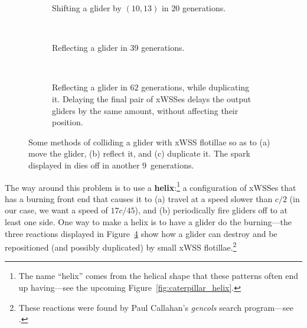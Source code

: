 \begin{figure}[!htb]
	\centering
	\begin{subfigure}[b]{0.475\textwidth}
		\centering
		\caption{Shifting a glider by $(10,13)$ in $20$ generations.}\label{fig:helix_shift}
	\end{subfigure} \quad \ \ \ \begin{subfigure}[b]{0.475\textwidth}
		\centering
		\caption{Reflecting a glider in $39$ generations.}\label{fig:helix_reflect}
	\end{subfigure}\\[0.3cm]
	\begin{subfigure}[b]{\textwidth}
		\centering
		\caption{Reflecting a glider in $62$ generations, while duplicating it. Delaying the final pair of xWSSes delays the output gliders by the same amount, without affecting their position.}\label{fig:helix_duplicate}
	\end{subfigure}
	\caption{Some methods of colliding a glider with xWSS flotillae so as to (a) move the glider, (b) reflect it, and (c) duplicate it. The spark displayed in  dies off in another 9~generations.}\label{fig:helix_operations}
\end{figure}

The way around this problem is to use a \textbf{helix}:\footnote{The name ``helix'' comes from the helical shape that these patterns often end up having---see the upcoming Figure~\ref{fig:caterpillar_helix}.} a configuration of xWSSes that has a burning front end that causes it to (a) travel at a speed slower than $c/2$ (in our case, we want a speed of $17c/45$), and (b) periodically fire gliders off to at least one side. One way to make a helix is to have a glider do the burning---the three reactions displayed in Figure~\ref{fig:helix_operations} show how a glider can destroy and be repositioned (and possibly duplicated) by small xWSS flotillae.\footnote{These reactions were found by Paul Callahan's \emph{gencols} search program---see .}

